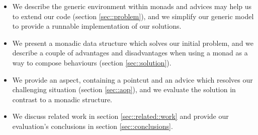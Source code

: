 \begin{itemize}
    
    \item We describe the generic environment within monads and advices may help us to extend our code (section \ref{sec::problem}), and we simplify our generic model 
    to provide a runnable implementation of our solutions.
    
    \item We present a monadic data structure which solves our initial problem, and we describe a couple of advantages and disadvantages when using a monad as a way to compose behaviours (section \ref{sec::solution}).
    
    \item We provide an aspect, containing a pointcut and an advice which resolves our challenging situation (section \ref{sec::aop}), and we evaluate the solution in contrast to a monadic structure. 
    
    \item We discuss related work in section \ref{sec::related::work} and provide our evaluation's  conclusions in section \ref{sec::conclusions}. 
    
\end{itemize}

